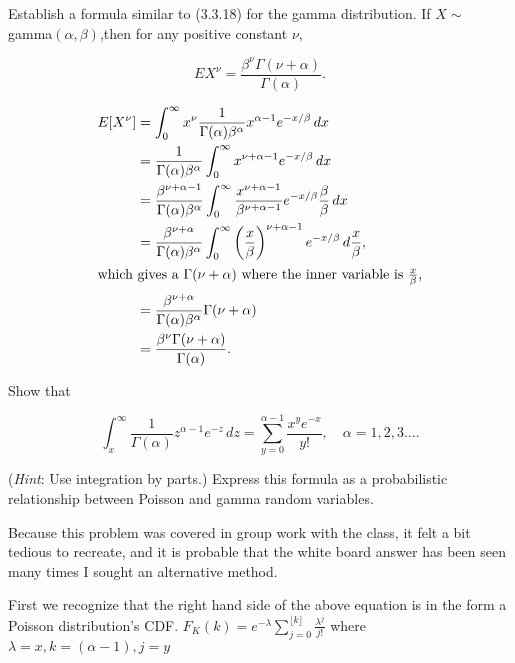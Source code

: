 \documentclass[12pt,letterpaper]{exam}
\begin{document}
\begin{questions}
	\setcounter{question}{16}
	\question 
	Establish a formula similar to (3.3.18) for the gamma distribution. 
	If \(X \sim\) gamma\((\alpha,\beta)\),then for any positive constant \(\nu\),
	
	\[EX^\nu = \frac{\beta^\nu \Gamma (\nu+\alpha)}{\Gamma(\alpha)}.\]
	
	\begin{solution}
		\begin{align*}
			E[X^\nu]
			&= \int_{0}^{\infty} x^\nu \frac{1}{\Gamma(\alpha)\beta^\alpha} x^{\alpha-1} e^{-x/\beta} \,dx \\
			&= \frac{1}{\Gamma(\alpha)\beta^\alpha} \int_{0}^{\infty} x^{\nu+\alpha-1} e^{-x/\beta} \,dx \\
			&= \frac{\beta^{\nu+\alpha-1}}{\Gamma(\alpha)\beta^\alpha} \int_{0}^{\infty} \frac{x^{\nu+\alpha-1}}{\beta^{\nu+\alpha-1}} e^{-x/\beta} \frac{\beta}{\beta} \,dx \\
			&= \frac{\beta^{\nu+\alpha}}{\Gamma(\alpha)\beta^\alpha} \int_{0}^{\infty} \left(\frac{x}{\beta}\right)^{\nu+\alpha-1} e^{-x/\beta} \,d\frac{x}{\beta}, \\
			\intertext{which gives a \(\Gamma(\nu+\alpha)\) where the inner variable is \(\frac{x}{\beta}\),}
			&= \frac{\beta^{\nu+\alpha}}{\Gamma(\alpha)\beta^\alpha} \Gamma(\nu+\alpha) \\
			&= \frac{\beta^{\nu}\Gamma(\nu+\alpha)}{\Gamma(\alpha)}.  
		\end{align*}
	\end{solution}
	
	\setcounter{question}{18}
	\question 
	Show that
	
	\[
		\int_{x}^{\infty} \frac{1}{\Gamma(\alpha)} z^{\alpha-1}e^{-z} \,dz = 
		\sum_{y=0}^{\alpha-1} \frac{x^y e^{-x}}{y!}, \quad \alpha=1,2,3\ldots.
	\]
	
	(\textit{Hint}: Use integration by parts.) Express this formula as a probabilistic relationship
	between Poisson and gamma random variables.
	
	\begin{solution}
		Because this problem was covered in group work with the class, it felt a bit tedious to recreate, 
		and it is probable that the white board answer has been seen many times I sought an alternative method.
		
		
		First we recognize that the right hand side of the above equation is in the form a Poisson distribution's CDF.
		\(F_K(k) = e^{-\lambda}\sum_{j=0}^{\lfloor k\rfloor} \frac{\lambda^j}{j!} \)
		where
		\(\lambda = x, k = (\alpha-1), j = y\)
		

\end{solution}
\end{questions}
\end{document}
